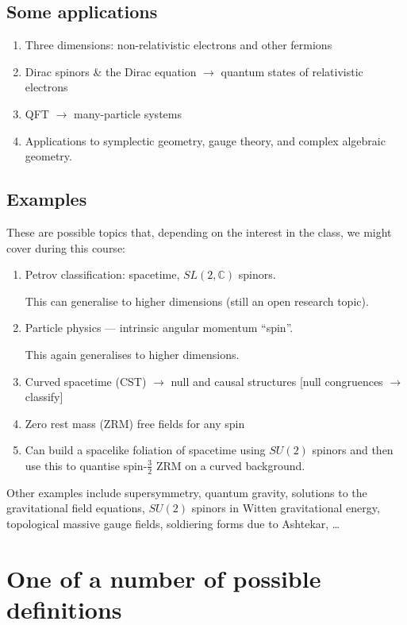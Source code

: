 \subsection*{Some applications}%

\begin{enumerate}[1)]
  \item Three dimensions: non-relativistic electrons and other fermions
  \item Dirac spinors \& the Dirac equation $\rightarrow$ quantum states of relativistic electrons
  \item QFT $\rightarrow$ many-particle systems
  \item Applications to symplectic geometry, gauge theory, and complex algebraic geometry.
\end{enumerate}

\subsection*{Examples}%

These are possible topics that, depending on the interest in the class, we might cover during this course:
\begin{enumerate}[1)]
  \item Petrov classification: spacetime, $SL(2, \mathbb{C})$ spinors.\par This can generalise to higher dimensions (still an open research topic).
  \item Particle physics --- intrinsic angular momentum ``spin''.\par This again generalises to higher dimensions.
  \item Curved spacetime (CST) $\rightarrow$ null and causal structures [null congruences $\rightarrow$ classify]
  \item Zero rest mass (ZRM) free fields for any spin
  \item Can build a spacelike foliation of spacetime using $SU(2)$ spinors and then use this to quantise spin-$\frac{3}{2}$ ZRM on a curved background.
\end{enumerate}

Other examples include  supersymmetry, quantum gravity, solutions to the gravitational field equations, $SU(2)$  spinors in Witten gravitational energy, topological massive gauge fields, soldiering forms due to Ashtekar, \dots

\section{One of a number of possible definitions}%
\label{sec:one_of_a_number_of_possible_definitions}

